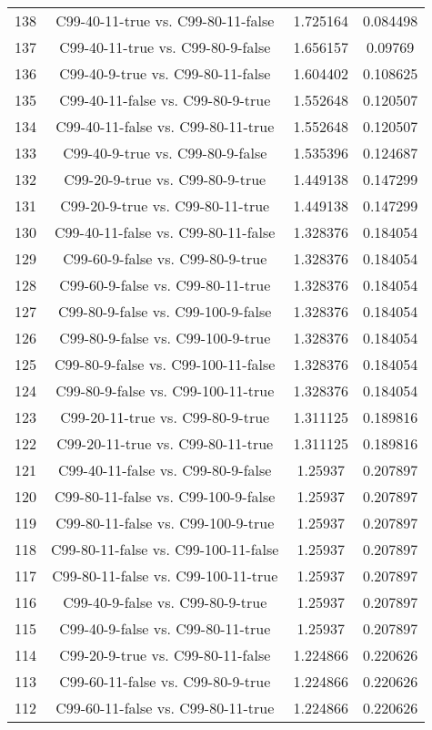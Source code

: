 \documentclass[a4paper,10pt]{article}
\begin{document}
\begin{landscape}
\begin{table}[!htp]
\begin{tabular}{cccc}
138&C99-40-11-true vs. C99-80-11-false&1.725164&0.084498\\
137&C99-40-11-true vs. C99-80-9-false&1.656157&0.09769\\
136&C99-40-9-true vs. C99-80-11-false&1.604402&0.108625\\
135&C99-40-11-false vs. C99-80-9-true&1.552648&0.120507\\
134&C99-40-11-false vs. C99-80-11-true&1.552648&0.120507\\
133&C99-40-9-true vs. C99-80-9-false&1.535396&0.124687\\
132&C99-20-9-true vs. C99-80-9-true&1.449138&0.147299\\
131&C99-20-9-true vs. C99-80-11-true&1.449138&0.147299\\
130&C99-40-11-false vs. C99-80-11-false&1.328376&0.184054\\
129&C99-60-9-false vs. C99-80-9-true&1.328376&0.184054\\
128&C99-60-9-false vs. C99-80-11-true&1.328376&0.184054\\
127&C99-80-9-false vs. C99-100-9-false&1.328376&0.184054\\
126&C99-80-9-false vs. C99-100-9-true&1.328376&0.184054\\
125&C99-80-9-false vs. C99-100-11-false&1.328376&0.184054\\
124&C99-80-9-false vs. C99-100-11-true&1.328376&0.184054\\
123&C99-20-11-true vs. C99-80-9-true&1.311125&0.189816\\
122&C99-20-11-true vs. C99-80-11-true&1.311125&0.189816\\
121&C99-40-11-false vs. C99-80-9-false&1.25937&0.207897\\
120&C99-80-11-false vs. C99-100-9-false&1.25937&0.207897\\
119&C99-80-11-false vs. C99-100-9-true&1.25937&0.207897\\
118&C99-80-11-false vs. C99-100-11-false&1.25937&0.207897\\
117&C99-80-11-false vs. C99-100-11-true&1.25937&0.207897\\
116&C99-40-9-false vs. C99-80-9-true&1.25937&0.207897\\
115&C99-40-9-false vs. C99-80-11-true&1.25937&0.207897\\
114&C99-20-9-true vs. C99-80-11-false&1.224866&0.220626\\
113&C99-60-11-false vs. C99-80-9-true&1.224866&0.220626\\
112&C99-60-11-false vs. C99-80-11-true&1.224866&0.220626\\

\end{tabular}
\end{table}
\end{landscape}
\end{document}
